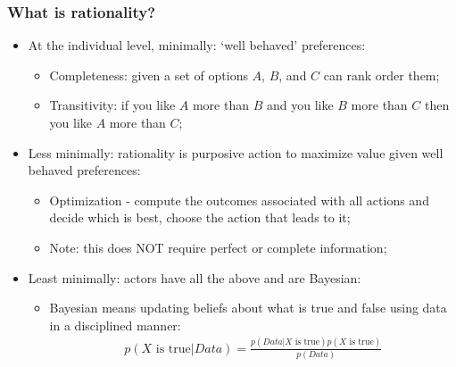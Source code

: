 \documentclass[aspectratio=169]{beamer}
\theoremstyle{principle}
\begin{document}
\begin{frame}
\frametitle{What is rationality?}

\begin{itemize}
\item At the individual level, minimally: `well behaved' preferences:
\begin{itemize}
\item Completeness: given a set of options $A$, $B$, and $C$ can rank order them;
\item Transitivity: if you like $A$ more than $B$ and you like $B$ more than $C$ then you like $A$ more than $C$;
\end{itemize}
\bigskip
\item Less minimally: rationality is purposive action to maximize value given well behaved preferences:\color{white}
\begin{itemize}
\item Optimization - compute the outcomes associated with all actions and decide which is best, choose the action that leads to it;
\item Note: this does NOT require perfect or complete information;
\end{itemize}
\bigskip
\item[] Least minimally: actors have all the above and are Bayesian:
\begin{itemize}
\item[] \color{white}Bayesian means updating beliefs about what is true and false using data in a disciplined manner:
\begin{align*}
p(X\mbox{ is true}|Data) = \frac{p(Data|X\mbox{ is true})p(X\mbox{ is true})}{p(Data)}
\end{align*}
\end{itemize}
\end{itemize} 

\end{frame}
\end{document}
